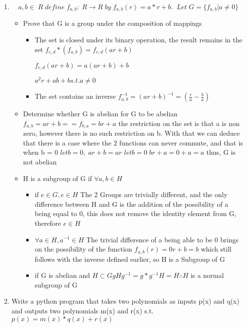 \documentclass[12pt]{article}
\begin{document}
\begin{enumerate}
  \item 
    \[
      a,b \in \;R \;define \;f_{a,b}: \;R \rightarrow R \;by \;f_{a,b}(r) = a*r + b. \;\; Let \;G = \{ f_{a,b} | a \ne 0 \} \]
    \begin{itemize}
      \item Prove that G is a group under the composition of mappings
        \begin{itemize}
          \item The set is closed under its binary operation, the result remains in the set
            $f_{c,d} * (f_{a,b}) = f_{c,d}(ar + b)$\par
            $f_{c,d}(ar+b) = a(ar+b) + b $ \par
            $a^2r + ab + b s.t. a \ne 0 $
          \item The set contains an inverse
            $f_{a,b}^{-1} = (ar+b)^{-1} = (\frac{r}{a} - \frac{b}{a})$
        \end{itemize}
        \item Determine whether G is abelian
          for G to be abelian $ f_{a,b} = ar + b == f_{b,a} = br + a$
          the restriction on the set is that a is non zero, however there is no such restriction on b.  With that we can deduce that there is a case where the 2 functions can never commute, and that is when b = 0
          $ let b = 0, \; ar + b = ar $
          $ let b = 0 \; br + a = 0 + a = a$ thus, G is not abelian
        \item H is a subgroup of G if $ \forall a,b \in H$
          \begin{itemize}
            \item if $ e \in G, e \in H $
              The 2 Groups are trivially different, and the only difference between H and G is the addition of the possibility of a being equal to 0, this does not remove the identity element from G, therefore $ e \in H $
            \item $ \forall a \in H, a^{-1} \in H$
              The trivial difference of a being able to be 0 brings on the possibility of the function $ f_{a,b}(r) = 0r + b = b $ which still follows with the inverse defined earlier, so H is a Subgroup of G
            \item if G is abelian and $ H \subset G gHg^{-1} = g*g^{-1}H = H \therefore H $ is a normal subgroup of G
          \end{itemize}
		\end{itemize}
  \item Write a python program that takes two polynomials as inputs p(x) and q(x) and outputs two polynomials m(x) and r(x) s.t. $ p(x) = m(x)*q(x) + r(x)$

\end{enumerate}
\end{document}
